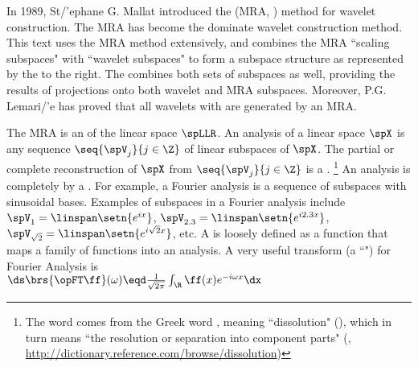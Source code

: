 \begin{minipage}{\tw-65mm}
  In 1989, St{/'e}phane G. Mallat introduced the  (MRA, )
  method for wavelet construction. The MRA has become the dominate wavelet construction method.
  This text uses the MRA method extensively, 
  and combines the MRA ``scaling subspaces"  with ``wavelet subspaces" 
  to form a subspace structure as represented by the 
   to the right.
  The  combines both sets of subspaces as well, 
  providing the results of projections onto both wavelet and MRA subspaces.
  Moreover, P.G. Lemari{/'e} has proved that all wavelets with  are generated by an MRA.\footnotemark
\end{minipage}\hfill%

The MRA is an  of the linear space $\spLLR$.
An analysis of a linear space $\spX$ is any sequence $\seq{\spV_j}{j\in\Z}$ of linear subspaces of $\spX$.
        The partial or complete reconstruction of $\spX$ from $\seq{\spV_j}{j\in\Z}$ is a .%
        \footnote{%
          The word  comes from the Greek word
          {},
          meaning ``dissolution" (),
          which in turn means
          ``the resolution or separation into component parts"
          (, \scs\url{http://dictionary.reference.com/browse/dissolution})
          }
  An analysis is completely  by a .
  For example, a Fourier analysis is a sequence of subspaces with sinusoidal bases.
  Examples of subspaces in a Fourier analysis include $\spV_1=\linspan\setn{e^{ix}}$, 
  $\spV_{2.3}=\linspan\setn{e^{i2.3x}}$, $\spV_{\sqrt{2}}=\linspan\setn{e^{i\sqrt{2}x}}$, etc.
  A  is loosely defined as a function that maps a family of functions
  into an analysis.
  A very useful transform (a ``") for Fourier Analysis is 
  \\\indentx$\ds\brs{\opFT\ff}(\omega) \eqd \frac{1}{\sqrt{2\pi}} \int_\R \ff(x) e^{-i\omega x} \dx$

